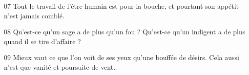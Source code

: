 
07 Tout le travail de l’être humain est pour la bouche, et pourtant son appétit n’est jamais comblé.

08 Qu’est-ce qu’un sage a de plus qu’un fou ? Qu’est-ce qu’un indigent a de plus quand il se tire d’affaire ?

09 Mieux vaut ce que l’on voit de ses yeux qu’une bouffée de désirs. Cela aussi n’est que vanité et poursuite de vent.